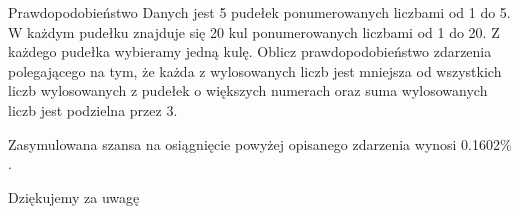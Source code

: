 \documentclass{beamer}
\begin{document}
  \begin{frame}{Prawdopodobieństwo}
    Danych jest 5 pudełek ponumerowanych liczbami od 1 do 5. W każdym pudełku znajduje się 20 kul ponumerowanych liczbami od 1 do 20.
    Z każdego pudełka wybieramy jedną kulę. Oblicz prawdopodobieństwo zdarzenia polegającego na tym, że każda z wylosowanych liczb jest
    mniejsza od wszystkich liczb wylosowanych z pudełek o większych numerach oraz suma wylosowanych liczb jest podzielna przez 3.  
    
    Zasymulowana szansa na osiągnięcie powyżej opisanego zdarzenia wynosi 0.1602\% . 
  \end{frame}

  \begin{frame}
    \centering \huge Dziękujemy za uwagę 
  \end{frame}
\end{document}
